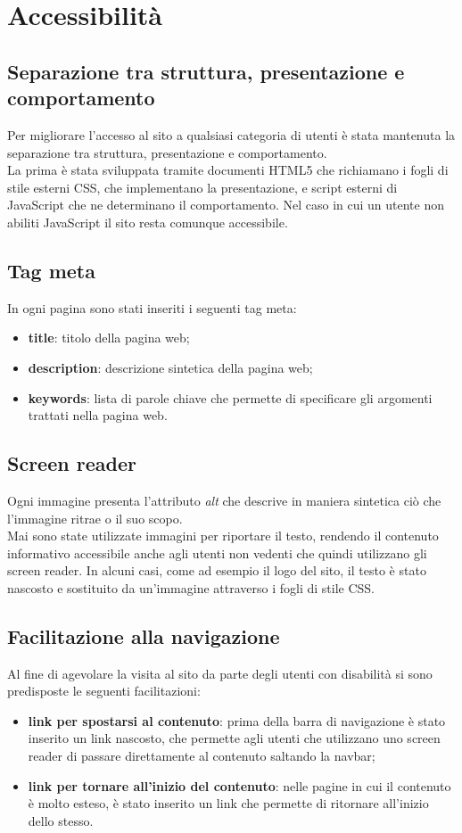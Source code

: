 \section{Accessibilità}
\subsection{Separazione tra struttura, presentazione e comportamento}
Per migliorare l'accesso al sito a qualsiasi categoria di utenti è stata mantenuta la separazione tra struttura, presentazione e comportamento. \\
La prima è stata sviluppata tramite documenti HTML5 che richiamano i fogli di stile esterni CSS, che implementano la presentazione, e script esterni di JavaScript che ne determinano il comportamento. Nel caso in cui un utente non abiliti JavaScript il sito resta comunque accessibile.
\subsection{Tag meta}
In ogni pagina sono stati inseriti i seguenti tag meta:
\begin{itemize}
	\item \textbf{title}: titolo della pagina web;
	\item \textbf{description}: descrizione sintetica della pagina web;
	\item \textbf{keywords}: lista di parole chiave che permette di specificare gli argomenti trattati nella pagina web. 
\end{itemize}
\subsection{Screen reader}
Ogni immagine presenta l'attributo \textit{alt} che descrive in maniera sintetica ciò che l'immagine ritrae o il suo scopo. \\ Mai sono state utilizzate immagini per riportare il testo, rendendo il contenuto informativo accessibile anche agli utenti non vedenti che quindi utilizzano gli screen reader. In alcuni casi, come ad esempio il logo del sito, il testo è stato nascosto e sostituito da un'immagine attraverso i fogli di stile CSS.

\subsection{Facilitazione alla navigazione}
Al fine di agevolare la visita al sito da parte degli utenti con disabilità si sono predisposte le seguenti facilitazioni:
\begin{itemize}
	\item \textbf{link per spostarsi al contenuto}: prima della barra di navigazione è stato inserito un link nascosto, che permette agli utenti che utilizzano uno screen reader di passare direttamente al contenuto saltando la navbar;
	\item \textbf{link per tornare all'inizio del contenuto}: nelle pagine in cui il contenuto è molto esteso, è stato inserito un link che permette di ritornare all'inizio dello stesso.
\end{itemize}
\newpage
